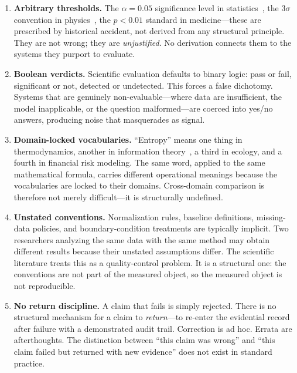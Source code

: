 \documentclass[
  aps,
  prd,
  twocolumn,
  superscriptaddress,
  nofootinbib,
  floatfix
]{revtex4-2}
\begin{document}
\begin{enumerate}[leftmargin=*,label=(\roman*)]
\item \textbf{Arbitrary thresholds.}  The $\alpha = 0.05$
  significance level in statistics~\cite{fisher1925}, the
  $3\sigma$ convention in physics~\cite{pdg2024}, the
  $p < 0.01$ standard in medicine---these are prescribed by
  historical accident, not derived from any structural principle.
  They are not wrong; they are \emph{unjustified}.  No derivation
  connects them to the systems they purport to evaluate.

\item \textbf{Boolean verdicts.}  Scientific evaluation defaults
  to binary logic: pass or fail, significant or not, detected or
  undetected.  This forces a false dichotomy.  Systems that are
  genuinely non-evaluable---where data are insufficient, the model
  inapplicable, or the question malformed---are coerced into
  yes/no answers, producing noise that masquerades as signal.

\item \textbf{Domain-locked vocabularies.}
  ``Entropy'' means one thing in thermodynamics, another
  in information theory~\cite{shannon1948,cover2006elements},
  a third in ecology, and a fourth in financial risk modeling.
  The same word, applied to the same mathematical formula,
  carries different operational meanings because the
  vocabularies are locked to their domains.  Cross-domain
  comparison is therefore not merely difficult---it is
  structurally undefined.

\item \textbf{Unstated conventions.}  Normalization rules, baseline
  definitions, missing-data policies, and boundary-condition
  treatments are typically implicit.  Two researchers analyzing the
  same data with the same method may obtain different results
  because their unstated assumptions differ.  The scientific
  literature treats this as a quality-control problem.  It is a
  structural one: the conventions are not part of the measured
  object, so the measured object is not reproducible.

\item \textbf{No return discipline.}  A claim that fails is simply
  rejected.  There is no structural mechanism for a claim to
  \emph{return}---to re-enter the evidential record after failure
  with a demonstrated audit trail.  Correction is ad hoc.  Errata
  are afterthoughts.  The distinction between ``this claim was
  wrong'' and ``this claim failed but returned with new evidence''
  does not exist in standard practice.
\end{enumerate}
\end{document}
